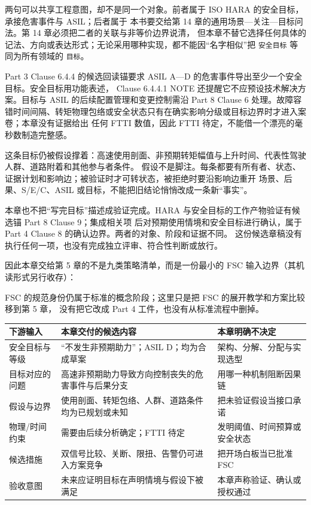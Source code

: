 两句可以共享工程意图，却不是同一个对象。前者属于 ISO HARA 的安全目标，承接危害事件与 ASIL；后者属于
本书要交给第 14 章的通用场景—关注—目标问法。第 14 章必须把二者的关联与非等价边界说清，
但本章不替它选择任何具体的记法、方向或表达形式；无论采用哪种实现，都不能因“名字相似”把
\allowbreak{}\texttt{安全目标}\allowbreak{} 等同为所有领域的 \allowbreak{}\texttt{目标}\allowbreak{}。

Part 3 Clause 6.4.4 的候选回读锚要求 ASIL A—D 的危害事件导出至少一个安全目标。安全目标用功能表述，
Clause 6.4.4.1 NOTE 还提醒它不应预设技术解决方案。目标与 ASIL 的后续配置管理和变更控制需沿 Part 8 Clause 6
处理。故障容错时间间隔、转矩物理包络或安全状态只有在确实影响分级或目标边界时才进入案卷；本章没有证据给出
任何 FTTI 数值，因此 FTTI 待定，不能借一个漂亮的毫秒数制造完整感。

这条目标仍被假设撑着：高速使用剖面、非预期转矩幅值与上升时间、代表性驾驶人群、道路附着和其他参与者条件。
假设不是脚注。每条都要有所有者、状态、证据计划和影响边；被验证时才可转状态，被拒绝时要沿影响边重开
场景、后果、S/E/C、ASIL 或目标，不能把旧结论悄悄改成一条新“事实”。

本章也不把“写完目标”描述成验证完成。HARA 与安全目标的工作产物验证有候选锚 Part 8 Clause 9；集成相关项
后对预期使用情境和安全目标进行确认，属于 Part 4 Clause 8 的确认边界。两者的对象、阶段和证据不同。
这份候选章稿没有执行任何一项，也没有完成独立评审、符合性判断或放行。

因此本章交给第 5 章的不是九类策略清单，而是一份最小的 FSC 输入边界（其机读形式另行收存）：

FSC 的规范身份仍属于标准的概念阶段；这里只是把 FSC 的展开教学和方案比较移到第 5 章，
没有把它改成 Part 4 工件，也没有从标准流程中删掉。

\begin{center}
\begingroup\small
\setlength{\tabcolsep}{4pt}
\begin{tabularx}{\linewidth}{@{}XXX@{}}
\toprule
下游输入 & 本章交付的候选内容 & 本章明确不决定 \\
\midrule
安全目标与等级 & “不发生非预期助力”；ASIL D；均为合成草案 & 架构、分解、分配与实现选型 \\
目标对应的问题 & 高速非预期助力导致方向控制丧失的危害事件与后果分支 & 用哪一种机制阻断因果链 \\
假设与边界 & 使用剖面、转矩包络、人群、道路条件均为已规划或未知 & 把未验证假设当接口承诺 \\
物理/时间约束 & 需要由后续分析确定；FTTI 待定 & 发明阈值、时间预算或安全状态 \\
候选措施 & 双信号比较、关断、限扭、告警仍可进入方案竞争 & 把开场白板当已批准 FSC \\
验收意图 & 未来应证明目标在声明情境与假设下被满足 & 本章声称验证、确认或授权通过 \\
\bottomrule
\end{tabularx}
\endgroup
\end{center}

